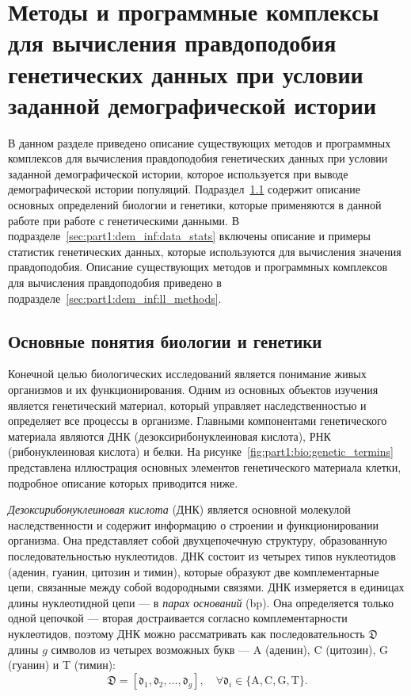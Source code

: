 \section{Методы и программные комплексы для вычисления правдоподобия генетических данных при условии заданной демографической истории}
\label{sec:part1:ll_methods}

В данном разделе приведено описание существующих методов и программных комплексов для вычисления правдоподобия генетических данных при условии заданной демографической истории, которое используется при выводе демографической истории популяций.
Подраздел~\ref{sec:part1:dem_inf:biology} содержит описание основных определений биологии и генетики, которые применяются в данной работе при работе с генетическими данными.
В подразделе~\ref{sec:part1:dem_inf:data_stats} включены описание и примеры статистик генетических данных, которые используются для вычисления значения правдоподобия.
Описание существующих методов и программных комплексов для вычисления правдоподобия приведено в подразделе~\ref{sec:part1:dem_inf:ll_methods}.

\subsection{Основные понятия биологии и генетики}
\label{sec:part1:dem_inf:biology}

Конечной целью биологических исследований является понимание живых организмов и их функционирования.
Одним из основных объектов изучения является генетический материал, который управляет наследственностью и определяет все процессы в организме.
Главными компонентами генетического материала являются ДНК (дезоксирибонуклеиновая кислота), РНК (рибонуклеиновая кислота) и белки.
На рисунке~\ref{fig:part1:bio:genetic_termins} представлена иллюстрация основных элементов генетического материала клетки, подробное описание которых приводится ниже. 

\emph{Дезоксирибонуклеиновая кислота} (ДНК) является основной молекулой наследственности и содержит информацию о строении и функционировании организма.
Она представляет собой двухцепочечную структуру, образованную последовательностью нуклеотидов.
ДНК состоит из четырех типов нуклеотидов (аденин, гуанин, цитозин и тимин), которые образуют две комплементарные цепи, связанные между собой водородными связями.
ДНК измеряется в единицах длины нуклеотидной цепи --- в \emph{парах оснований} (bp).
Она определяется только одной цепочкой --- вторая достраивается согласно комплементарности нуклеотидов, поэтому ДНК можно рассматривать как последовательность $\mathfrak{D}$ длины $g$ символов из четырех возможных букв --- A (аденин), C (цитозин), G (гуанин) и T (тимин):
$$\mathfrak{D} = [\mathfrak{d}_1, \mathfrak{d}_2, \ldots, \mathfrak{d}_g],\quad \forall \mathfrak{d}_i\in \{\text{A}, \text{C}, \text{G}, \text{T}\}.$$

